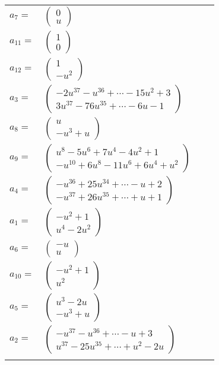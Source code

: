 \documentclass[1p]{elsarticle_modified}
\theoremstyle{definition}
\begin{document}
\begin{tabular}{m{7pt} m{180pt} m{7pt} m{180pt} }
\flushright $a_{7}=$&$\begin{pmatrix}0\\u\end{pmatrix}$ \\
\flushright $a_{11}=$&$\begin{pmatrix}1\\0\end{pmatrix}$ \\
\flushright $a_{12}=$&$\begin{pmatrix}1\\- u^2\end{pmatrix}$ \\
\flushright $a_{3}=$&$\begin{pmatrix}-2 u^{37}- u^{36}+\cdots-15 u^2+3\\3 u^{37}-76 u^{35}+\cdots-6 u-1\end{pmatrix}$ \\
\flushright $a_{8}=$&$\begin{pmatrix}u\\- u^3+u\end{pmatrix}$ \\
\flushright $a_{9}=$&$\begin{pmatrix}u^8-5 u^6+7 u^4-4 u^2+1\\- u^{10}+6 u^8-11 u^6+6 u^4+u^2\end{pmatrix}$ \\
\flushright $a_{4}=$&$\begin{pmatrix}- u^{36}+25 u^{34}+\cdots- u+2\\- u^{37}+26 u^{35}+\cdots+u+1\end{pmatrix}$ \\
\flushright $a_{1}=$&$\begin{pmatrix}- u^2+1\\u^4-2 u^2\end{pmatrix}$ \\
\flushright $a_{6}=$&$\begin{pmatrix}- u\\u\end{pmatrix}$ \\
\flushright $a_{10}=$&$\begin{pmatrix}- u^2+1\\u^2\end{pmatrix}$ \\
\flushright $a_{5}=$&$\begin{pmatrix}u^3-2 u\\- u^3+u\end{pmatrix}$ \\
\flushright $a_{2}=$&$\begin{pmatrix}- u^{37}- u^{36}+\cdots- u+3\\u^{37}-25 u^{35}+\cdots+u^2-2 u\end{pmatrix}$\\&\end{tabular}
\end{document}
